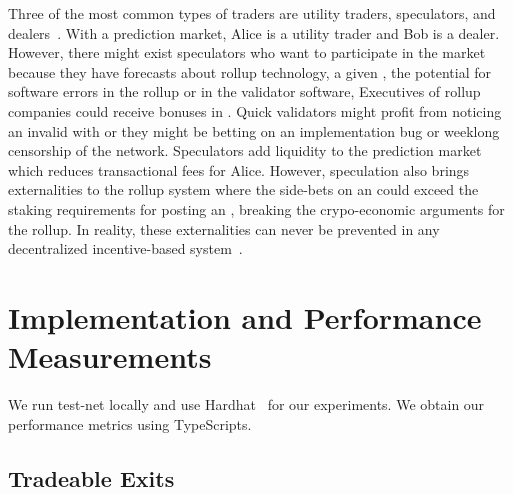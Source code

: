 Three of the most common types of traders are utility traders, speculators, and dealers~\cite{Har03}. With a prediction market, Alice is a utility trader and Bob is a dealer. However, there might exist speculators who want to participate in the market because they have forecasts about rollup technology, a given \rblock, the potential for software errors in the rollup or in the validator software, \etc Executives of rollup companies could receive bonuses in \final. Quick validators might profit from noticing an invalid \rblock with \fail or they might be betting on an implementation bug or weeklong censorship of the network. Speculators add liquidity to the prediction market which reduces transactional fees for Alice. However, speculation also brings externalities to the rollup system where the side-bets on an \rblock could exceed the staking requirements for posting an \rblock, breaking the crypo-economic arguments for the rollup. In reality, these externalities can never be prevented in any decentralized incentive-based system~\cite{FoBo19}. 

\section{Implementation and Performance Measurements} 

We run \arb \nitro test-net locally and use Hardhat~\cite{hardhatonline} for our experiments. We obtain our performance metrics using TypeScripts. 


\subsection{Tradeable Exits}

